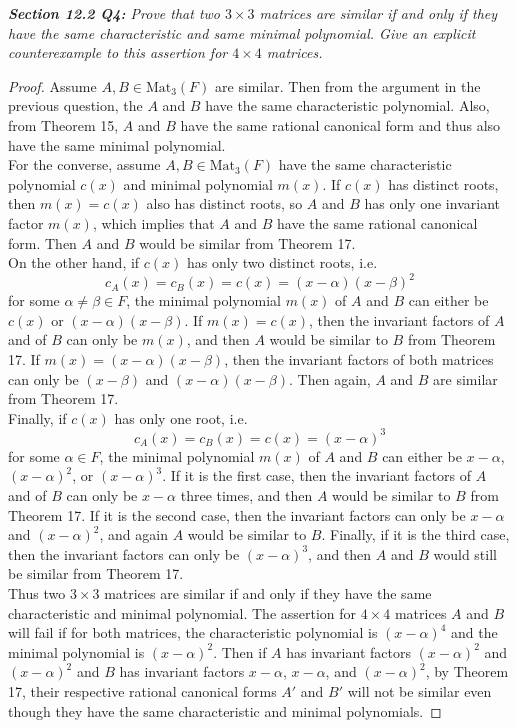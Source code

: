 \documentclass{article}
\begin{document}
\it \textbf{Section 12.2 Q4:} Prove that two $3\times3$ matrices are
  similar if and only if they have the same characteristic and same minimal
  polynomial. Give an explicit counterexample to this assertion for
  $4\times4$ matrices.

  \begin{proof}
    Assume $A,B\in\text{Mat}_3(F)$ are similar. Then from the argument in
    the previous question, the $A$ and $B$ have the same characteristic
    polynomial. Also, from Theorem 15, $A$ and $B$ have the same rational
    canonical form and thus also have the same minimal polynomial.\\

    For the converse, assume $A,B\in\text{Mat}_3(F)$ have the same
    characteristic polynomial $c(x)$ and minimal polynomial $m(x)$. If
    $c(x)$ has distinct roots, then $m(x)=c(x)$ also has distinct roots, so
    $A$ and $B$ has only one invariant factor $m(x)$, which implies that
    $A$ and $B$ have the same rational canonical form. Then $A$ and $B$
    would be similar from Theorem 17. \\

    On the other hand, if $c(x)$ has only two distinct roots, i.e.
    \[c_A(x)=c_B(x)=c(x) =(x-\alpha)(x-\beta)^2\]
    for some $\alpha\neq\beta\in F$, the minimal polynomial $m(x)$ of $A$
    and $B$ can either be $c(x)$ or $(x-\alpha)(x-\beta)$. If
    $m(x)=c(x)$, then the invariant factors of $A$ and of $B$ can only be
    $m(x)$, and then $A$ would be similar to $B$ from Theorem 17. If
    $m(x)=(x-\alpha)(x-\beta)$, then the invariant factors of both matrices
    can only be $(x-\beta)$ and $(x-\alpha)(x-\beta)$. Then again, $A$ and
    $B$ are similar from Theorem 17. \\

    Finally, if $c(x)$ has only one root, i.e.
    \[c_A(x)=c_B(x)=c(x) =(x-\alpha)^3\]
    for some $\alpha\in F$, the minimal polynomial $m(x)$ of $A$ and $B$
    can either be $x-\alpha$, $(x-\alpha)^2$, or $(x-\alpha)^3$. If it is
    the first case, then the invariant factors of $A$ and of $B$ can only
    be $x-\alpha$ three times, and then $A$ would be similar to $B$ from
    Theorem 17. If it is the second case, then the invariant factors can
    only be $x-\alpha$ and $(x-\alpha)^2$, and again $A$ would be similar
    to $B$. Finally, if it is the third case, then the invariant factors
    can only be $(x-\alpha)^3$, and then $A$ and $B$ would still be
    similar from Theorem 17. \\

    Thus two $3\times3$ matrices are similar if and only if they have the
    same characteristic and minimal polynomial. The assertion for
    $4\times4$ matrices $A$ and $B$ will fail if for both matrices, the
    characteristic polynomial is $(x-\alpha)^4$ and the minimal polynomial
    is $(x-\alpha)^2$. Then if $A$ has invariant factors $(x-\alpha)^2$ and
    $(x-\alpha)^2$ and $B$ has invariant factors $x-\alpha$, $x-\alpha$,
    and $(x-\alpha)^2$, by Theorem 17, their respective rational canonical
    forms $A'$ and $B'$ will not be similar even though they have the same
    characteristic and minimal polynomials.
  \end{proof}
\end{document}
